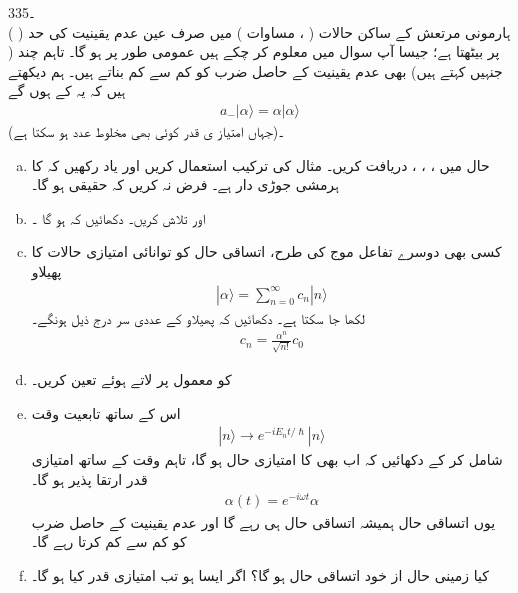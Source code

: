 3۔35\\
 \quad ہارمونی مرتعش کے ساکن حالات (  ،  مساوات )   میں صرف  عین عدم یقینیت کی
 حد ( )  پر بیٹھتا ہے؛ جیسا آپ سوال   میں معلوم کر چکے ہیں عمومی طور پر  ہو گا۔ تاہم چند  ( جنہیں کہتے ہیں) بھی عدم یقینیت کے حاصل ضرب کو کم سے کم  بناتے  ہیں۔   ہم دیکھتے ہیں کہ  یہ  کے  ہوں گے
\begin{align*}
a_{-}|\alpha\rangle =\alpha|\alpha\rangle
\end{align*}
(جہاں امتیاز ی قدر    کوئی بھی مخلوط عدد  ہو سکتا ہے)۔
\begin{enumerate}[a.]  
\item
حال   میں  ،   ،   ،   دریافت کریں۔  مثال   کی ترکیب استعمال کریں   اور یاد رکھیں کہ   کا  ہرمشی  جوڑی دار  ہے۔   فرض نہ کریں کہ  حقیقی ہو  گا۔   
\item
{} اور  تلاش کریں۔ دکھائیں کہ    ہو گا ۔  
\item
کسی بھی دوسرے تفاعل موج کی طرح،  اتساقی  حال کو توانائی امتیازی حالات کا                       پھیلاو  
  \begin{align*} 
|\alpha\rangle=\sum_{n=0}^{\infty}c_{n}|n\rangle 
  \end{align*} 
  لکھا جا سکتا ہے۔  دکھائیں  کہ پھیلاو کے عددی سر درج ذیل ہونگے۔  
  \begin{align*} 
c_{n}=\frac{\alpha^{n}}{\sqrt{n!}}c_{0} 
  \end{align*} 
\item
    کو معمول پر لاتے ہوئے  تعین کریں۔     
  \item
      اس کے ساتھ  تابعیت وقت  
  \begin{align*} 
|n\rangle\to e^{-iE_{n}t/\hslash}|n\rangle 
  \end{align*} 
شامل کر کے دکھائیں کہ  اب بھی  کا امتیازی حال   ہو گا، تاہم وقت کے ساتھ امتیازی  قدر  ارتقا  پذیر   ہو گا۔   
  \begin{align*} 
\alpha(t)=e^{-i\omega t}\alpha 
  \end{align*} 
یوں  اتساقی  حال ہمیشہ اتساقی  حال ہی رہے گا اور عدم یقینیت کے حاصل ضرب کو کم سے کم  کرتا رہے  گا۔   
\item
کیا زمینی حال  از خود اتساقی  حال ہو گا؟  اگر ایسا ہو تب امتیازی قدر کیا   ہو گا۔
\end{enumerate}

